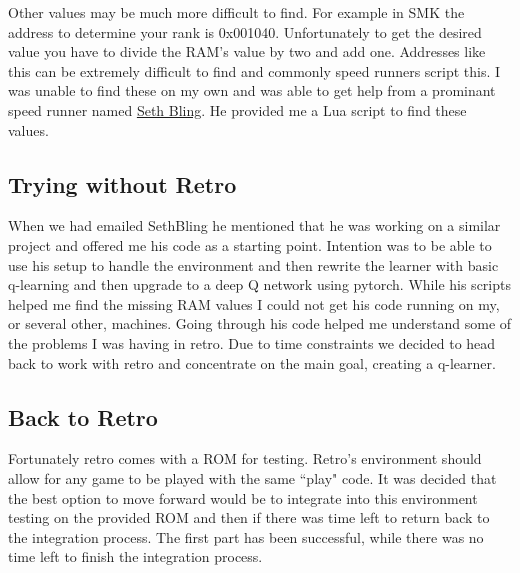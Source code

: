 \documentclass[12pt,letter]{article}
\begin{document}
Other values may be much more difficult to find. For example in SMK the address
to determine your rank is 0x001040. Unfortunately to get the desired value
you have to divide the RAM's value by two and add one. Addresses like this 
can be extremely difficult to find and commonly speed runners script this. I 
was unable to find these on my own and was able to get help from a prominant
speed runner named \href{https://www.youtube.com/user/sethbling}{Seth Bling}.
He provided me a Lua script to find these values. 

\subsection{Trying without Retro}
When we had emailed SethBling he mentioned that he was working on a similar 
project and offered me his code as a starting point. Intention was to be able
to use his setup to handle the environment and then rewrite the learner with
basic q-learning and then upgrade to a deep Q network using pytorch. While his
scripts helped me find the missing RAM values I could not get his code running
on my, or several other, machines. Going through his code helped me understand
some of the problems I was having in retro. Due to time constraints we decided
to head back to work with retro and concentrate on the main goal, creating a
q-learner.

\subsection{Back to Retro}
Fortunately retro comes with a ROM for testing. Retro's environment should allow
for any game to be played with the same ``play" code. It was decided that the
best option to move forward would be to integrate into this environment testing
on the provided ROM and then if there was time left to return back to the 
integration process. The first part has been successful, while there was no
time left to finish the integration process.
\end{document}

